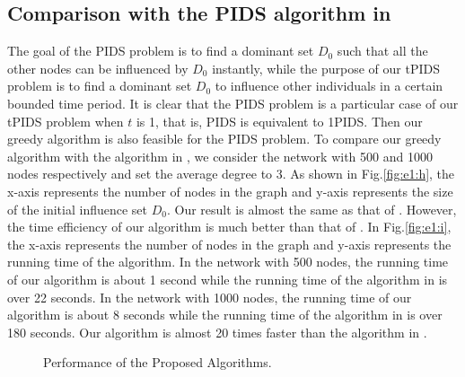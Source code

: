 \subsection{Comparison with the PIDS algorithm in \cite{WDC2011}}
The goal of the PIDS problem is to find a dominant set $D_0$ such that all the other nodes can be 
influenced by $D_0$ instantly, while the purpose of our tPIDS problem is to find a dominant set $D_0$ to
influence other individuals in a certain bounded time period. 
It is clear that the PIDS problem is a particular case of our tPIDS problem when $t$ is 1, that is, PIDS is equivalent to 1PIDS.
Then our greedy algorithm is also feasible for the PIDS problem. 
To compare our greedy algorithm with the algorithm in \cite{WDC2011}, we consider the network with 500
and 1000 nodes respectively and set the average degree to 3. As shown in Fig.\ref{fig:e1:h},
the x-axis represents the number of nodes in the graph and y-axis represents the size of the 
initial influence set $D_0$. Our result is almost the same as that of \cite{WDC2011}. 
However, the time efficiency of our algorithm is much better than that of \cite{WDC2011}. 
In Fig.\ref{fig:e1:i}, the x-axis represents the number of nodes in the graph and y-axis represents the running time
of the algorithm. In the network with 500 nodes, the running time of our algorithm is about 1 second 
while the running time of the algorithm in \cite{WDC2011} is over 22 seconds. 
In the network with 1000 nodes, the running time of our algorithm is about 8 seconds while the running time of the algorithm in \cite{WDC2011} is over 180 seconds. Our algorithm is almost 20 times faster than the algorithm in \cite{WDC2011}.
\begin{figure}[!htb]
 \hfil
{}
\caption{Performance of the Proposed Algorithms.}
\label{fig:e4}
\end{figure}
